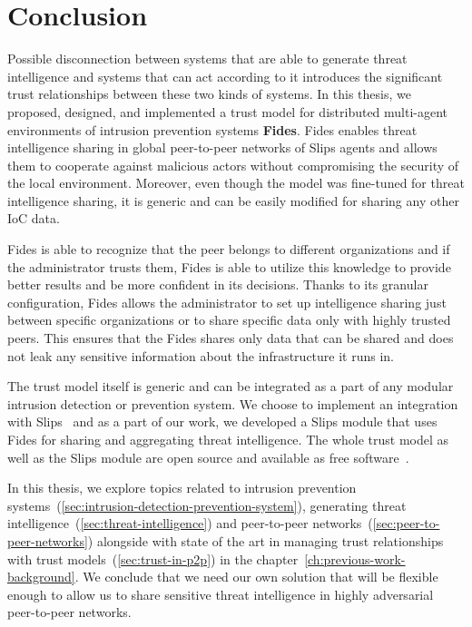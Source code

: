 \chapter{Conclusion}
\label{ch:conclusion}

Possible disconnection between systems that are able to generate threat intelligence and systems that can act according to it introduces the significant trust relationships between these two kinds of systems.
In this thesis, we proposed, designed, and implemented a trust model for distributed multi-agent environments of intrusion prevention systems \textbf{Fides}.
Fides enables threat intelligence sharing in global peer-to-peer networks of Slips agents and allows them to cooperate against malicious actors without compromising the security of the local environment. 
Moreover, even though the model was fine-tuned for threat intelligence sharing, it is generic and can be easily modified for sharing any other IoC data.

Fides is able to recognize that the peer belongs to different organizations and if the administrator trusts them, Fides is able to utilize this knowledge to provide better results and be more confident in its decisions.
Thanks to its granular configuration, Fides allows the administrator to set up intelligence sharing just between specific organizations or to share specific data only with highly trusted peers.
This ensures that the Fides shares only data that can be shared and does not leak any sensitive information about the infrastructure it runs in.

The trust model itself is generic and can be integrated as a part of any modular intrusion detection or prevention system. We choose to implement an integration with Slips~\cite{slips} and as a part of our work, we developed a Slips module that uses Fides for sharing and aggregating threat intelligence.
The whole trust model as well as the Slips module are open source and available as free software~\cite{fidesGithub}.

In this thesis, we explore topics related to intrusion prevention systems~(\ref{sec:intrusion-detection-prevention-system}), generating threat intelligence~(\ref{sec:threat-intelligence}) and peer-to-peer networks~(\ref{sec:peer-to-peer-networks}) alongside with state of the art in managing trust relationships with trust models~(\ref{sec:trust-in-p2p}) in the chapter~\ref{ch:previous-work-background}.
We conclude that we need our own solution that will be flexible enough to allow us to share sensitive threat intelligence in highly adversarial peer-to-peer networks.

